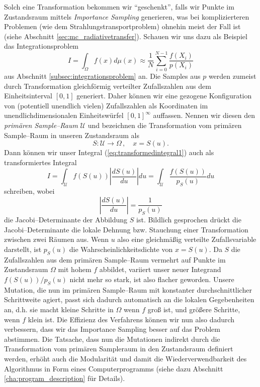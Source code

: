 	Solch eine Transformation bekommen wir ``geschenkt'', falls wir Punkte im Zustandsraum mittels {\em Importance Sampling} generieren, was bei komplizierteren Problemen (wie dem Strahlungstransportproblem) ohnehin meist der Fall ist (siehe Abschnitt \ref{sec:mc_radiativetransfer}). Schauen wir uns dazu als Beispiel das Integrationsproblem
	\begin{equation}
		I=\int_\Omega f(x) d\mu(x)\approx \frac{1}{N}\sum_{i=0}^{N-1} \frac{f(X_i)}{p(X_i)}
		\label{eq:transformedintegral1}
	\end{equation}
	aus Abschnitt \ref{subsec:integrationsproblem} an. Die Samples aus $p$ werden zumeist durch Transformation gleichförmig verteilter Zufallszahlen aus dem Einheitsinterval $[0,1]$ generiert. Daher können wir eine gezogene Konfiguration von (potentiell unendlich vielen) Zufallszahlen als Koordinaten im unendlichdimensionalen Einheitswürfel $[0,1]^\infty$ auffassen. Nennen wir diesen den {\em primären Sample--Raum} $\mathcal{U}$ und bezeichnen die Transformation vom primären Sample--Raum in unseren Zustandsraum als
	$$S : \mathcal{U} \to \Omega\,,\quad x=S(u).$$
	Dann können wir unser Integral (\ref{eq:transformedintegral1}) auch als transformiertes Integral
	$$I=\int_\mathcal{U} f(S(u)) \left|\frac{dS(u)}{du}\right|du=\int_\mathcal{U} \frac{f(S(u))}{p_S(u)}du$$
	schreiben, wobei
	$$\left|\frac{dS(u)}{du}\right|=\frac{1}{p_S(u)}$$
	die Jacobi--Determinante der Abbildung $S$ ist. Bildlich gesprochen drückt die Jacobi--Determinante die lokale Dehnung bzw. Stauchung einer Transformation zwischen zwei Räumen aus. Wenn $u$ also eine gleichmäßig verteilte Zufallsvariable darstellt, ist $p_S(u)$ die Wahrscheinlichkeitsdichte von $x=S(u)$. Da $S$ die Zufallszahlen aus dem primären Sample--Raum vermehrt auf Punkte im Zustandsraum $\Omega$ mit hohem $f$ abbildet, variiert unser neuer Integrand $f(S(u))/p_S(u)$ nicht mehr so stark, ist also flacher geworden. Unsere Mutation, die nun im primären Sample--Raum mit konstanter durchschnittlicher Schrittweite agiert, passt sich dadurch automatisch an die lokalen Gegebenheiten an, d.h. sie macht kleine Schritte in $\Omega$ wenn $f$ groß ist, und größere Schritte, wenn $f$ klein ist. Die Effizienz des Verfahrens können wir nun also dadurch verbessern, dass wir das Importance Sampling besser auf das Problem abstimmen. Die Tatsache, dass nun die Mutationen indirekt durch die Transformation vom primären Sampleraum in den Zustandsraum definiert werden, erhöht auch die Modularität und damit die Wiederverwendbarkeit des Algorithmus in Form eines Computerprogramms (siehe dazu Abschnitt \ref{cha:program_description} für Details).


